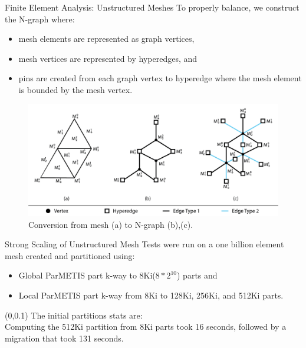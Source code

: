 \documentclass{beamer}
\begin{document}
\begin{textblock}{15.6}
\begin{textblock}{5}
\begin{block}{\centering Finite Element Analysis: Unstructured Meshes}
      To properly balance, we construct the N-graph where:
      \begin{itemize}
      \item mesh elements are represented as graph vertices,
      \item mesh vertices are represented by hyperedges, and
      \item pins are created from each graph vertex to hyperedge where the mesh element is bounded by the mesh vertex.
      \end{itemize}
      \begin{figure}
        \centering
        \includegraphics[width=.7\textwidth]{../figures/exampleMesh2Graph_backgroundless.png}
        \caption{Conversion from mesh (a) to N-graph (b),(c).}
      \end{figure}
    \end{block}
    \begin{block}{\centering Strong Scaling of Unstructured Mesh}
      Tests were run on a one billion element mesh created and partitioned using:
      \begin{itemize}
      \item Global ParMETIS part k-way to 8Ki($8*2^{10}$) parts and
      \item Local ParMETIS part k-way from 8Ki to 128Ki, 256Ki, and 512Ki parts.
      \end{itemize}
      \begin{textblock}{2.3}(0,0.1)
        The initial partitions stats are: \\[1cm]

        Computing the 512Ki partition from 8Ki parts took 16 seconds, followed by a migration that took 131 seconds.
        

\end{textblock}
\end{block}
\end{textblock}
\end{textblock}
\end{document}
